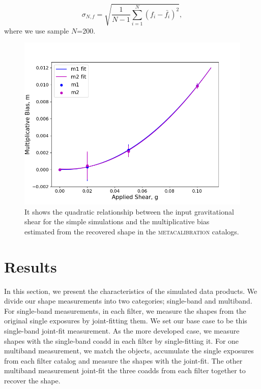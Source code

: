 \documentclass[fleqn,usenatbib]{mnras}
\begin{document}
\begin{equation}
    \sigma_{N,f} = \sqrt{\frac{1}{N-1} \sum_{i=1}^{N}(f_{i}-\bar{f_{i}})^{2}}, 
\end{equation}
where we use sample $N$=200. 

\begin{figure}
	\includegraphics[width=\columnwidth]{metacal_bias_shear.png}
    \vspace*{-5mm}
    \caption{It shows the quadratic relationship between the input gravitational shear for the simple simulations and the multiplicative bias estimated from the recovered shape in the \textsc{metacalibration} catalogs. }
    \label{fig:metacal_shear_linear}
\end{figure}

\section{Results}
\label{sec:results}
In this section, we present the characteristics of the simulated data products. We divide our shape measurements into two categories; single-band and multiband. For single-band measurements, in each filter, we measure the shapes from the original single exposures by joint-fitting them. We set our base case to be this single-band joint-fit measurement. As the more developed case, we measure shapes with the single-band coadd in each filter by single-fitting it. For one multiband measurement, we match the objects, accumulate the single exposures from each filter catalog and measure the shapes with the joint-fit. The other multiband measurement joint-fit the three coadds from each filter together to recover the shape. 
\end{document}
